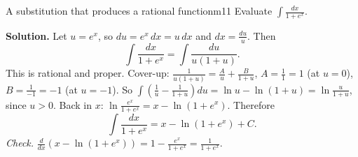 \documentclass[11pt]{article}
\begin{document}
\begin{exmp}{A substitution that produces a rational function}{m11}
Evaluate $\displaystyle\int\frac{dx}{1+e^x}$.

\textbf{Solution.} Let $u=e^x$, so $du=e^x\,dx=u\,dx$ and $dx=\frac{du}u$. Then
\[\int\frac{dx}{1+e^x}=\int\frac{du}{u(1+u)} .\]
This is rational and proper. Cover-up: $\frac1{u(1+u)}=\frac Au+\frac B{1+u}$, $A=\frac11=1$ (at $u=0$), $B=\frac1{-1}=-1$ (at $u=-1$). So $\int\left(\frac1u-\frac1{1+u}\right)du=\ln u-\ln(1+u)=\ln\frac u{1+u}$, since $u>0$. Back in $x$: $\ln\frac{e^x}{1+e^x}=x-\ln(1+e^x)$. Therefore
\[\int\frac{dx}{1+e^x}=x-\ln\left(1+e^x\right)+C .\]
\emph{Check.} $\frac d{dx}\left(x-\ln(1+e^x)\right)=1-\frac{e^x}{1+e^x}=\frac1{1+e^x}$.
\end{exmp}
\end{document}
